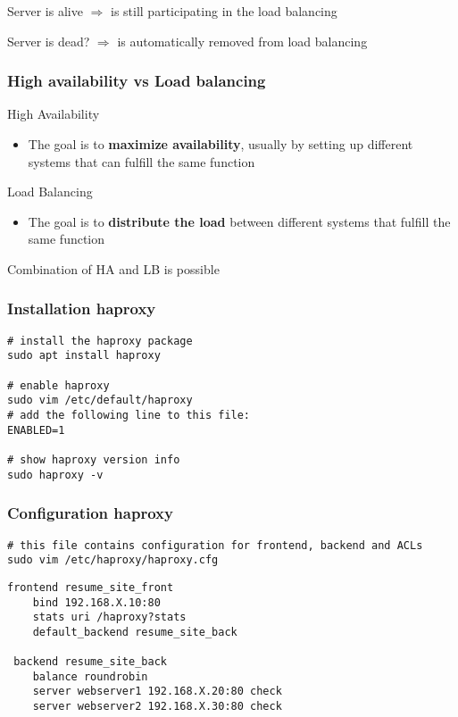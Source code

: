 \documentclass{article}
\begin{document}
Server is alive $\Rightarrow$ is still participating in the load balancing

Server is dead? $\Rightarrow$ is automatically removed from load balancing

\subsubsection{High availability vs Load balancing}

High Availability

\begin{itemize}
    \item The goal is to \textbf{maximize availability}, usually by setting up different systems that can fulfill the same function
\end{itemize}

Load Balancing

\begin{itemize}
    \item The goal is to \textbf{distribute the load} between different systems that fulfill the same function
\end{itemize}

Combination of HA and LB is possible

\subsubsection{Installation haproxy}

\begin{verbatim}
# install the haproxy package
sudo apt install haproxy

# enable haproxy
sudo vim /etc/default/haproxy
# add the following line to this file:
ENABLED=1

# show haproxy version info
sudo haproxy -v
\end{verbatim}

\subsubsection{Configuration haproxy}

\begin{verbatim}
# this file contains configuration for frontend, backend and ACLs
sudo vim /etc/haproxy/haproxy.cfg
\end{verbatim}

\begin{verbatim}
frontend resume_site_front
    bind 192.168.X.10:80
    stats uri /haproxy?stats
    default_backend resume_site_back
 
 backend resume_site_back
    balance roundrobin
    server webserver1 192.168.X.20:80 check
    server webserver2 192.168.X.30:80 check
\end{verbatim}
\end{document}

